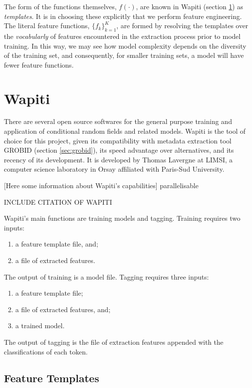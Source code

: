 The form of the functions themselves, $f(\cdot)$, are known in Wapiti (section \ref{sec:wapiti}) as \emph{templates}. It is in choosing these explicitly that we perform feature engineering. The literal feature functions, $\{f_k\}_{k=1}^K$, are formed by resolving the templates over the \emph{vocabularly} of features encountered in the extraction process prior to model training. In this way, we may see how model complexity depends on the diversity of the training set, and consequently, for smaller training sets, a model will have fewer feature functions. 

\section{Wapiti}
\label{sec:wapiti}

There are several open source softwares for the general purpose training and application of conditional random fields and related models. Wapiti is the tool of choice for this project, given its compatibility with metadata extraction tool GROBID (section \ref{sec:grobid}), its speed advantage over alternatives, and its recency of its development. It is developed by Thomas Lavergne at LIMSI, a computer science laboratory in Orsay affiliated with Paris-Sud University.

[Here some information about Wapiti's capabilities] parallelisable

INCLUDE CITATION OF WAPITI

Wapiti's main functions are training models and tagging. Training requires two inputs:

\begin{enumerate}
\item a feature template file, and;
\item a file of extracted features.
\end{enumerate}

The output of training is a model file. Tagging requires three inputs:

\begin{enumerate}
\item a feature template file;
\item a file of extracted features, and;
\item a trained model.
\end{enumerate}

The output of tagging is the file of extraction features appended with the classifications of each token.

\subsection{Feature Templates}

